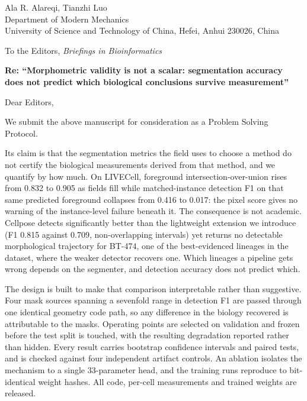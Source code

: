 \documentclass[11pt,a4paper]{article}
\begin{document}
\noindent Ala R. Alareqi, Tianzhi Luo\\
Department of Modern Mechanics\\
University of Science and Technology of China, Hefei, Anhui 230026, China

\vspace{0.6em}
\noindent To the Editors, \emph{Briefings in Bioinformatics}

\vspace{0.6em}
\noindent\textbf{Re: ``Morphometric validity is not a scalar: segmentation
accuracy does not predict which biological conclusions survive
measurement''}

\vspace{0.4em}
Dear Editors,

We submit the above manuscript for consideration as a Problem Solving Protocol.

Its claim is that the segmentation metrics the field uses to choose a
method do not certify the biological measurements derived from that method,
and we quantify by how much. On LIVECell, foreground
intersection-over-union rises from 0.832 to 0.905 as fields fill while
matched-instance detection F1 on that same predicted foreground collapses
from 0.416 to 0.017: the pixel score gives no warning of the instance-level
failure beneath it. The consequence is not academic. Cellpose detects
significantly better than the lightweight extension we introduce (F1 0.815
against 0.709, non-overlapping intervals) yet returns no detectable
morphological trajectory for BT-474, one of the best-evidenced lineages in
the dataset, where the weaker detector recovers one. Which lineages a
pipeline gets wrong depends on the segmenter, and detection accuracy does
not predict which.

The design is built to make that comparison interpretable rather than
suggestive. Four mask sources spanning a sevenfold range in detection F1
are passed through one identical geometry code path, so any difference in
the biology recovered is attributable to the masks. Operating points are
selected on validation and frozen before the test split is touched, with
the resulting degradation reported rather than hidden. Every result carries
bootstrap confidence intervals and paired tests, and is checked against
four independent artifact controls. An ablation isolates the mechanism to a
single 33-parameter head, and the training runs reproduce to bit-identical
weight hashes. All code, per-cell measurements and trained weights are
released.
\end{document}
